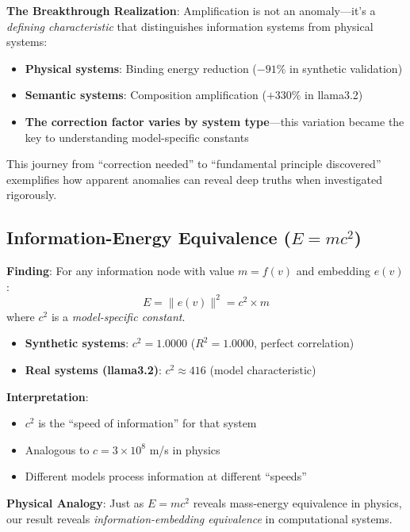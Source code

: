 \documentclass[11pt,a4paper]{article}
\newcommand{\norm}[1]{\|#1\|}
\begin{document}
\textbf{The Breakthrough Realization}: Amplification is not an anomaly---it's a \emph{defining characteristic} that distinguishes information systems from physical systems:

\begin{itemize}
    \item \textbf{Physical systems}: Binding energy reduction ($-91\%$ in synthetic validation)
    \item \textbf{Semantic systems}: Composition amplification ($+330\%$ in llama3.2)
    \item \textbf{The correction factor varies by system type}---this variation became the key to understanding model-specific constants
\end{itemize}

This journey from ``correction needed'' to ``fundamental principle discovered'' exemplifies how apparent anomalies can reveal deep truths when investigated rigorously.

\subsection{Information-Energy Equivalence ($E=mc^2$)}

\textbf{Finding}: For any information node with value $m = f(v)$ and embedding $e(v)$:
\begin{equation}
E = \norm{e(v)}^2 = c^2 \times m
\end{equation}
where $c^2$ is a \emph{model-specific constant}.

\begin{itemize}
    \item \textbf{Synthetic systems}: $c^2 = 1.0000$ ($R^2 = 1.0000$, perfect correlation)
    \item \textbf{Real systems (llama3.2)}: $c^2 \approx 416$ (model characteristic)
\end{itemize}

\textbf{Interpretation}: 
\begin{itemize}
    \item $c^2$ is the ``speed of information'' for that system
    \item Analogous to $c = 3 \times 10^8$ m/s in physics
    \item Different models process information at different ``speeds''
\end{itemize}

\textbf{Physical Analogy}: Just as $E=mc^2$ reveals mass-energy equivalence in physics, our result reveals \emph{information-embedding equivalence} in computational systems.
\end{document}
